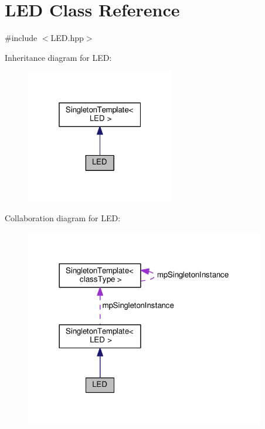 \hypertarget{classLED}{}\section{L\+ED Class Reference}
\label{classLED}


{\ttfamily \#include $<$L\+E\+D.\+hpp$>$}



Inheritance diagram for L\+ED\+:\nopagebreak
\begin{figure}[H]
\begin{center}
\leavevmode
\includegraphics[width=184pt]{df/d30/classLED__inherit__graph}
\end{center}
\end{figure}


Collaboration diagram for L\+ED\+:\nopagebreak
\begin{figure}[H]
\begin{center}
\leavevmode
\includegraphics[width=297pt]{d6/ddf/classLED__coll__graph}
\end{center}
\end{figure}
